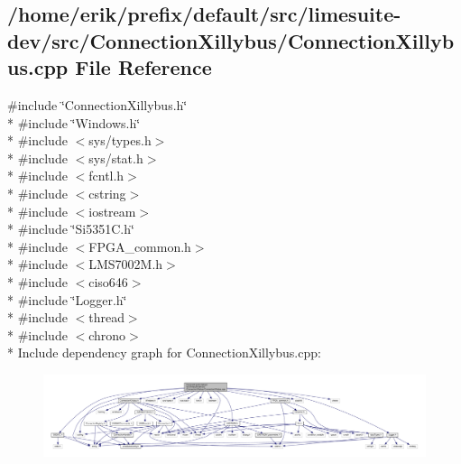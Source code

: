 \subsection{/home/erik/prefix/default/src/limesuite-\/dev/src/\+Connection\+Xillybus/\+Connection\+Xillybus.cpp File Reference}
\label{ConnectionXillybus_8cpp}
{\ttfamily \#include \char`\"{}Connection\+Xillybus.\+h\char`\"{}}\\*
{\ttfamily \#include \char`\"{}Windows.\+h\char`\"{}}\\*
{\ttfamily \#include $<$sys/types.\+h$>$}\\*
{\ttfamily \#include $<$sys/stat.\+h$>$}\\*
{\ttfamily \#include $<$fcntl.\+h$>$}\\*
{\ttfamily \#include $<$cstring$>$}\\*
{\ttfamily \#include $<$iostream$>$}\\*
{\ttfamily \#include \char`\"{}Si5351\+C.\+h\char`\"{}}\\*
{\ttfamily \#include $<$F\+P\+G\+A\+\_\+common.\+h$>$}\\*
{\ttfamily \#include $<$L\+M\+S7002\+M.\+h$>$}\\*
{\ttfamily \#include $<$ciso646$>$}\\*
{\ttfamily \#include \char`\"{}Logger.\+h\char`\"{}}\\*
{\ttfamily \#include $<$thread$>$}\\*
{\ttfamily \#include $<$chrono$>$}\\*
Include dependency graph for Connection\+Xillybus.\+cpp\+:
\nopagebreak
\begin{figure}[H]
\begin{center}
\leavevmode
\includegraphics[width=350pt]{dd/d6f/ConnectionXillybus_8cpp__incl}
\end{center}
\end{figure}
